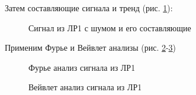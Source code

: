 \documentclass[a4paper,oneside,14pt]{extreport}
\begin{document}
Затем составляющие сигнала и тренд (рис. \ref{task1_signal2}):

\begin{figure}[!h]
	\caption{Сигнал из ЛР1 с шумом и его составляющие}
	\label{task1_signal2}
\end{figure}

\newpage
Применим Фурье и Вейвлет анализы (рис. \ref{task1_fft2}-\ref{task1_vevlet2})

\begin{figure}[!h]
	\caption{Фурье анализ сигнала из ЛР1}
	\label{task1_fft2}
\end{figure}

\begin{figure}[!h]
	\caption{Вейвлет анализ сигнала из ЛР1}
	\label{task1_vevlet2}
\end{figure}
\end{document}
